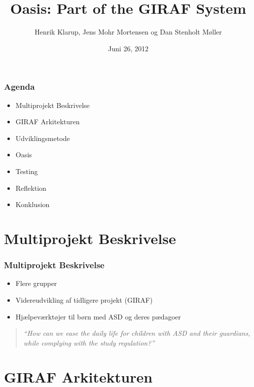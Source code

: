\documentclass{beamer}
\title{Oasis: Part of the GIRAF System}
\author{Henrik Klarup, Jens Mohr Mortensen og Dan Stenholt M\o{}ller}
\institute[AAU]{Aalborg University}
\date{Juni 26, 2012}
\begin{document}
\begin{frame}
	\titlepage
\end{frame}

\begin{frame}
	\frametitle{Agenda}
	\begin{itemize}
		\item Multiprojekt Beskrivelse
		\item GIRAF Arkitekturen
		\item Udviklingsmetode
		\item Oasis
		\item Testing
		\item Reflektion
		\item Konklusion
	\end{itemize}
\end{frame}

\section{Multiprojekt Beskrivelse}

\begin{frame}
	\frametitle{Multiprojekt Beskrivelse}
	\begin{itemize}
		\item Flere grupper
		\item Videreudvikling af tidligere projekt (GIRAF)
		\item Hj\ae{}lpev\ae{}rkt\o{}jer til b\o{}rn med ASD og deres p\ae{}dagoer
	\end{itemize}
	\begin{quote}
		\textit{``How can we ease the daily life for children with ASD and their guardians, while complying with the study regulation?''}
	\end{quote}
\end{frame}

\section{GIRAF Arkitekturen}
\end{document}
